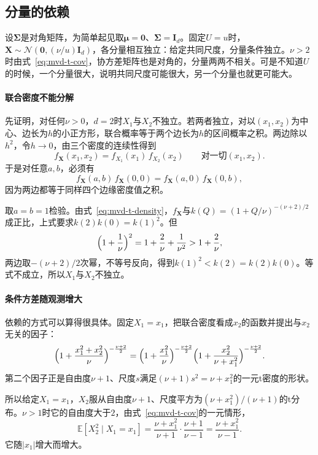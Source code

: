\subsection{分量的依赖}
\label{sec:mvd-t-dependence}

设$\bm{\Sigma}$是对角矩阵，为简单起见取$\bm{\mu}=\bm{0}$、$\bm{\Sigma}=\bm{I}_d$。固定$U=u$时，$\bm{X}\sim\mathcal{N}(\bm{0},(\nu/u)\bm{I}_d)$，各分量相互独立：给定共同尺度，分量条件独立。$\nu>2$时由式~\eqref{eq:mvd-t-cov}，协方差矩阵也是对角的，分量两两不相关。可是不知道$U$的时候，一个分量很大，说明共同尺度可能很大，另一个分量也就更可能大。

\paragraph{联合密度不能分解}
先证明，对任何$\nu>0$，$d=2$时$X_1$与$X_2$不独立。若两者独立，对以$(x_1,x_2)$为中心、边长为$h$的小正方形，联合概率等于两个边长为$h$的区间概率之积。两边除以$h^{2}$，令$h\to0$，由三个密度的连续性得到
\[
 f_{\bm{X}}(x_1,x_2)=f_{X_1}(x_1)\,f_{X_2}(x_2)\qquad\text{对一切}(x_1,x_2) .
\]
于是对任意$a,b$，必须有
\[
 f_{\bm{X}}(a,b)\,f_{\bm{X}}(0,0)=f_{\bm{X}}(a,0)\,f_{\bm{X}}(0,b) ,
\]
因为两边都等于同样四个边缘密度值之积。

取$a=b=1$检验。由式~\eqref{eq:mvd-t-density}，$f_{\bm{X}}$与$k(Q)=(1+Q/\nu)^{-(\nu+2)/2}$成正比，上式要求$k(2)k(0)=k(1)^{2}$。但
\[
 \Bigl(1+\frac1\nu\Bigr)^{2}=1+\frac2\nu+\frac{1}{\nu^{2}}>1+\frac2\nu ,
\]
两边取$-(\nu+2)/2$次幂，不等号反向，得到$k(1)^{2}<k(2)=k(2)k(0)$。等式不成立，所以$X_1$与$X_2$不独立。

\paragraph{条件方差随观测增大}
依赖的方式可以算得很具体。固定$X_1=x_1$，把联合密度看成$x_2$的函数并提出与$x_2$无关的因子：
\[
 \Bigl(1+\frac{x_1^{2}+x_2^{2}}{\nu}\Bigr)^{-\frac{\nu+2}{2}}=\Bigl(1+\frac{x_1^{2}}{\nu}\Bigr)^{-\frac{\nu+2}{2}}\Bigl(1+\frac{x_2^{2}}{\nu+x_1^{2}}\Bigr)^{-\frac{\nu+2}{2}} .
\]
第二个因子正是自由度$\nu+1$、尺度$s$满足$(\nu+1)s^{2}=\nu+x_1^{2}$的一元t密度的形状。

所以给定$X_1=x_1$，$X_2$服从自由度$\nu+1$、尺度平方为$(\nu+x_1^{2})/(\nu+1)$的t分布。$\nu>1$时它的自由度大于$2$，由式~\eqref{eq:mvd-t-cov}的一元情形，
\begin{equation}
 \mathbb{E}[X_2^{2}\mid X_1=x_1]=\frac{\nu+x_1^{2}}{\nu+1}\cdot\frac{\nu+1}{\nu-1}=\frac{\nu+x_1^{2}}{\nu-1} .
 \label{eq:mvd-t-conditional-second-moment}
\end{equation}
它随$\lvert x_1\rvert$增大而增大。

